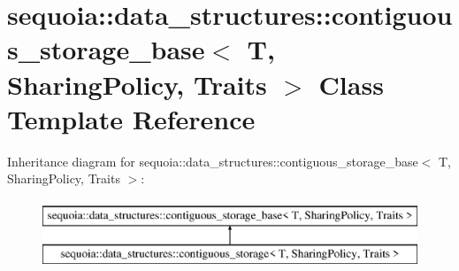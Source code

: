 \hypertarget{classsequoia_1_1data__structures_1_1contiguous__storage__base}{}\section{sequoia\+::data\+\_\+structures\+::contiguous\+\_\+storage\+\_\+base$<$ T, Sharing\+Policy, Traits $>$ Class Template Reference}
\label{classsequoia_1_1data__structures_1_1contiguous__storage__base}
Inheritance diagram for sequoia\+::data\+\_\+structures\+::contiguous\+\_\+storage\+\_\+base$<$ T, Sharing\+Policy, Traits $>$\+:\begin{figure}[H]
\begin{center}
\leavevmode
\includegraphics[height=2.000000cm]{classsequoia_1_1data__structures_1_1contiguous__storage__base}
\end{center}
\end{figure}
